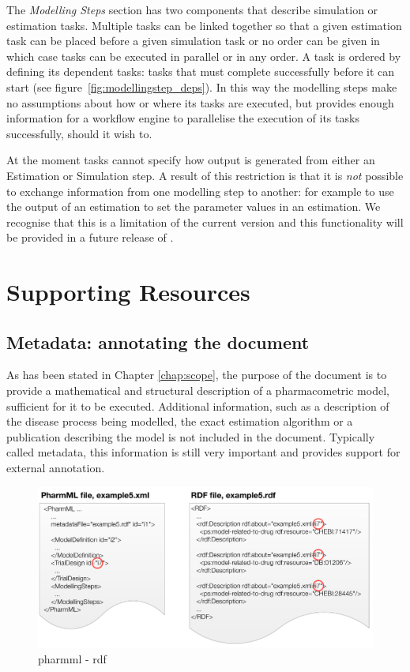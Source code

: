 The \emph{Modelling Steps} section has two components that describe
simulation or estimation tasks. Multiple tasks can be linked together so
that a given estimation task can be placed before a given simulation
task or no order can be given in which case tasks can be executed in
parallel or in any order. A task is ordered by defining its dependent
tasks: tasks that must complete successfully before it can start (see
figure~\ref{fig:modellingstep_deps}). In this way the modelling steps
make no assumptions about how or where its tasks are executed, but
provides enough information for a workflow engine to parallelise the
execution of its tasks successfully, should it wish to.

At the moment tasks cannot specify how output is generated from either
an Estimation or Simulation step. A result of this restriction is that
it is \emph{not} possible to exchange information from one modelling
step to another: for example to use the output of an estimation to set
the parameter values in an estimation. We recognise that this is a
limitation of the current version and this functionality will be
provided in a future release of \pharmml.


\section{Supporting Resources}
\label{sec:supporting-res}

\subsection{Metadata: annotating the \pharmml document}
\label{sec:annotation}

As has been stated in Chapter \ref{chap:scope}, the purpose of
the \pharmml document is to provide a mathematical and structural
description of a pharmacometric model, sufficient for it to be
executed. Additional information, such as a description of the disease
process being modelled, the exact estimation algorithm or a
publication describing the model is not included in the \pharmml
document. Typically called metadata, this information is still very 
important and \pharmml provides support for external annotation.

\begin{figure}[htbp]
\centering
\includegraphics[width=0.8\linewidth]{pics/PharmML_RDF.pdf}
\caption{pharmml - rdf}
\label{fig:pharmmlRdf}
\end{figure}


